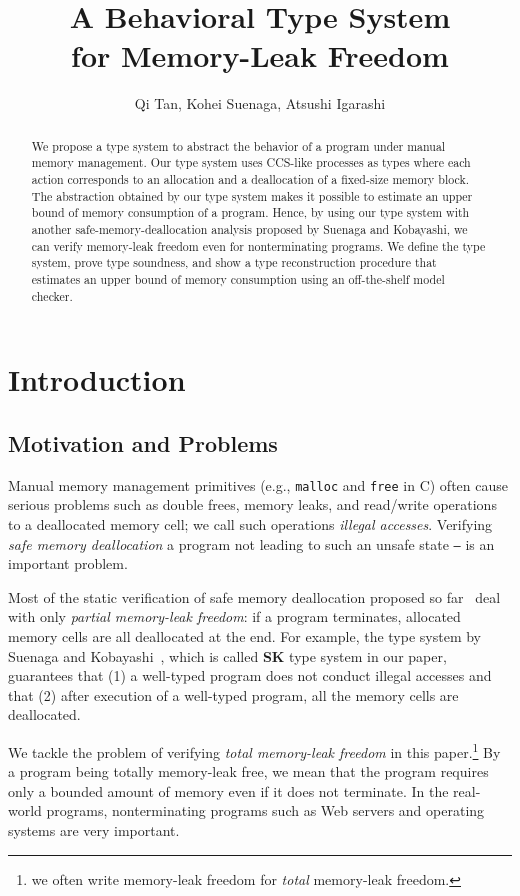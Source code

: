 \documentclass[english]{jssst_ppl} %
\title{A Behavioral Type System \\ for Memory-Leak Freedom}
\author{Qi Tan, Kohei Suenaga, Atsushi Igarashi}
\theoremstyle{definition}
\begin{document}
\maketitle
\begin{abstract} 
We propose a type system to abstract the behavior of a program under
manual memory management.  Our type system uses CCS-like processes as types where each action corresponds to an allocation and a
deallocation of a fixed-size memory block. The abstraction obtained
by our type system makes it possible to estimate an upper bound of
memory consumption of a program.
Hence, by using our type system with another safe-memory-deallocation analysis proposed by Suenaga and Kobayashi, we can verify memory-leak freedom even for nonterminating programs.  We define the type system, prove type soundness, and show a type reconstruction procedure that estimates an upper bound of memory consumption using an off-the-shelf model checker.
\end{abstract}

\section{Introduction}
\subsection{Motivation and Problems}
Manual memory management primitives (e.g., \texttt{malloc} and \texttt{free} in C) often cause serious problems such as double frees, memory leaks, and read/write operations to a deallocated memory cell; we call such operations \emph{illegal accesses}. Verifying \emph{safe memory deallocation} a program not leading to such an unsafe state \texttt{--} is an important problem.

Most of the static verification of safe memory deallocation proposed so far~\cite{DBLP:conf/aplas/SuenagaK09,DBLP:conf/pldi/HeineL03,DBLP:conf/sigsoft/XieA05,DBLP:journals/scp/SwamyHMGJ06} deal with only \emph{partial memory-leak freedom}: if a program terminates, allocated memory cells are all deallocated at the end. For example, the type system by Suenaga and Kobayashi~\cite{DBLP:conf/aplas/SuenagaK09}, which is called \textbf{SK} type system in our paper, guarantees that (1) a well-typed program does not conduct illegal accesses and that (2) after execution of a well-typed program, all the memory cells are deallocated.

We tackle the problem of verifying \emph{total memory-leak freedom} in this paper.\footnote{we often write memory-leak freedom for \emph{total} memory-leak freedom.} By a program being totally memory-leak free, we mean that the program requires only a bounded amount of memory even if it does not terminate. In the real-world programs, nonterminating programs such as Web servers and operating systems are very important.
\end{document}
